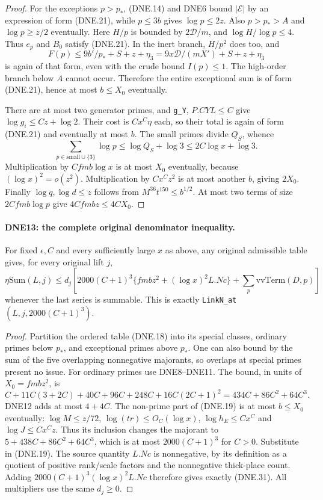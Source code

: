 \begin{proof}
For the exceptions $p>p_*$, (DNE.14) and DNE6 bound
$|\mathcal E|$ by an expression of form (DNE.21), while
$p\le3b$ gives $\log p\le2z$.  Also $p>p_*>A$ and
$\log p\ge z/2$ eventually.  Here $H/p$ is bounded by
$2\mathcal D/m$, and $\log H/\log p\le4$.
Thus $e_p$ and $B_0$ satisfy (DNE.21).  In the inert branch,
$H/p^2$ does too, and
\[
 F(p)\le9b'/p_*+S+z+\eta_3
       =9x\mathcal D/(mX')+S+z+\eta_3
\]
is again of that form, even with the crude bound $I(p)\le1$.
The high-order branch below $A$ cannot occur.  Therefore the
entire exceptional sum is of form (DNE.21), hence at most
$b\le X_0$ eventually.

There are at most two generator primes, and \texttt{g\_Y},
$P.CYL\le C$ give $\log g_i\le Cz+\log2$.  Their cost is
$Cx^C\eta$ each, so their total is again of form (DNE.21)
and eventually at most $b$.
The small primes divide $Q_S$, whence
\[
 \sum_{p\in\mathrm{small}\cup\{3\}}\log p
      \le\log Q_S+\log3\le2C\log x+\log3.
\]
Multiplication by $Cfm b\log x$ is at most $X_0$ eventually,
because $(\log x)^2=o(z^2)$.  Multiplication by $Cx^Cz^2$
is at most another $b$, giving $2X_0$.
Finally $\log q,\log d\le z$ follows from
$M^{36}t^{150}\le b^{1/2}$.  At most two terms of size
$2Cfm b\log p$ give $4Cfm bz\le4CX_0$.
\end{proof}

\paragraph{DNE13: the complete original denominator inequality.}
\label{claim:DNE13}
For fixed $\epsilon,C$ and every sufficiently large $x$ as above,
any original admissible table gives, for every original lift $j$,
\[
 \eta\mathrm{Sum}(L,j)
 \le d_j\left[2000(C+1)^3
       \{fm bz^2+(\log x)^2L.Nc\}
                       +\sum_p\mathrm{vvTerm}(D,p)\right]        \tag{DNE.31}
\]
whenever the last series is summable.  This is exactly
\texttt{LinkN\_at}$(L,j,2000(C+1)^3)$.

\begin{proof}
Partition the ordered table (DNE.18) into its special classes,
ordinary primes below $p_*$, and exceptional primes above $p_*$.
One can also bound by the sum of the five overlapping nonnegative
majorants, so overlaps at special primes present no issue.
For ordinary primes use DNE8--DNE11.  The bound, in units of
$X_0=fm bz^2$, is
\[
 C+11C(3+2C)+40C+96C+248C+16C(2C+1)^2
                 =434C+86C^2+64C^3.                    \tag{DNE.32}
\]
DNE12 adds at most $4+4C$.
The non-prime part of (DNE.19) is at most $b\le X_0$
eventually: $\log M\le z/72$, $\log(tr)\le O_C(\log x)$,
$\log h_E\le Cx^C$ and $\log J\le Cx^Cz$.
Thus its inclusion changes the majorant to
$5+438C+86C^2+64C^3$, which is at most $2000(C+1)^3$ for $C>0$.
Substitute in (DNE.19).
The source quantity $L.Nc$ is nonnegative, by its definition
as a quotient of positive rank/scale factors and the nonnegative
thick-place count.  Adding $2000(C+1)^3(\log x)^2L.Nc$ therefore
gives exactly (DNE.31).  All multipliers use the same $d_j\ge0$.
\end{proof}

